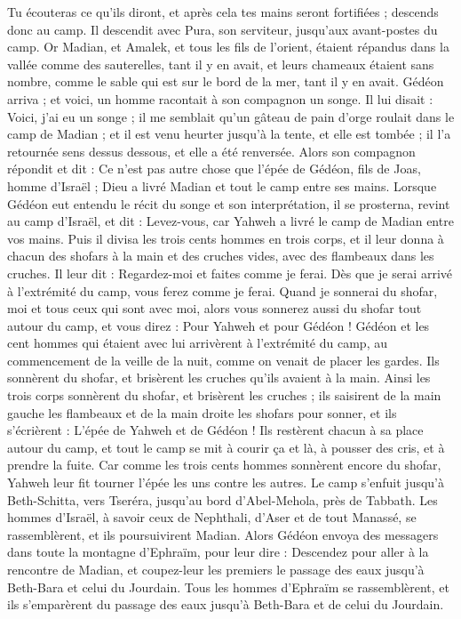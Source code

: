 \begin{multicols}{2}
Tu écouteras ce qu'ils diront, et après cela tes mains seront fortifiées ; descends donc au camp. Il descendit avec Pura, son serviteur, jusqu'aux avant-postes du camp.
Or Madian, et Amalek, et tous les fils de l'orient, étaient répandus dans la vallée comme des sauterelles, tant il y en avait, et leurs chameaux étaient sans nombre, comme le sable qui est sur le bord de la mer, tant il y en avait.
Gédéon arriva ; et voici, un homme racontait à son compagnon un songe. Il lui disait : Voici, j'ai eu un songe ; il me semblait qu'un gâteau de pain d'orge roulait dans le camp de Madian ; et il est venu heurter jusqu’à la tente, et elle est tombée ; il l’a retournée sens dessus dessous, et elle a été renversée.
Alors son compagnon répondit et dit : Ce n'est pas autre chose que l'épée de Gédéon, fils de Joas, homme d'Israël ; Dieu a livré Madian et tout le camp entre ses mains.
Lorsque Gédéon eut entendu le récit du songe et son interprétation, il se prosterna, revint au camp d'Israël, et dit : Levez-vous, car Yahweh a livré le camp de Madian entre vos mains.
Puis il divisa les trois cents hommes en trois corps, et il leur donna à chacun des shofars à la main et des cruches vides, avec des flambeaux dans les cruches.
Il leur dit : Regardez-moi et faites comme je ferai. Dès que je serai arrivé à l’extrémité du camp, vous ferez comme je ferai.
Quand je sonnerai du shofar, moi et tous ceux qui sont avec moi, alors vous sonnerez aussi du shofar tout autour du camp, et vous direz : Pour Yahweh et pour Gédéon !
Gédéon et les cent hommes qui étaient avec lui arrivèrent à l’extrémité du camp, au commencement de la veille de la nuit, comme on venait de placer les gardes. Ils sonnèrent du shofar, et  brisèrent les cruches qu'ils avaient à la main.
Ainsi les trois corps sonnèrent du shofar, et brisèrent les cruches ; ils saisirent de la main gauche les flambeaux et de la main droite les shofars pour sonner, et ils s’écrièrent : L'épée de Yahweh et de Gédéon !
Ils restèrent chacun à sa place autour du camp, et tout le camp se mit à courir ça et là, à pousser des cris, et à prendre la fuite.
Car comme les trois cents hommes sonnèrent encore du shofar, Yahweh leur fit tourner l'épée les uns contre les autres. Le camp s'enfuit jusqu'à Beth-Schitta, vers Tseréra, jusqu'au bord d'Abel-Mehola, près de Tabbath.
Les hommes d'Israël, à savoir ceux de Nephthali, d'Aser et de tout Manassé, se rassemblèrent, et ils poursuivirent Madian.
Alors Gédéon envoya des messagers dans toute la montagne d'Ephraïm, pour leur dire : Descendez pour aller à la rencontre de Madian, et coupez-leur les premiers le passage des eaux jusqu'à Beth-Bara et celui du Jourdain. Tous les hommes d'Ephraïm se rassemblèrent, et ils s’emparèrent du passage des eaux jusqu’à Beth-Bara et de celui du Jourdain.

\end{multicols}
